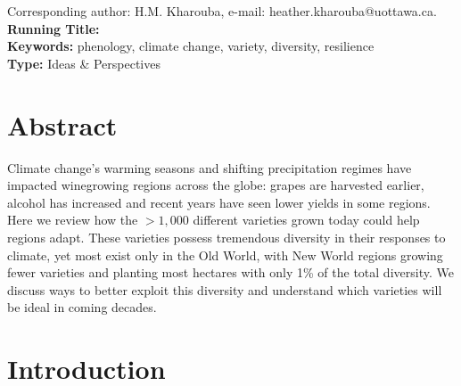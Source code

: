 \documentclass[11pt,letterpaper]{article}
\begin{document}
\linenumbers
\bigskip
\medskip
\begin{center}

\bigskip

\\
\bigskip
{}\\

\end{center}
\bigskip
\noindent Corresponding author: H.M. Kharouba, e-mail: heather.kharouba@uottawa.ca.\\

\noindent \textbf{Running Title:}\\
\noindent \textbf{Keywords:} phenology, climate change, variety, diversity, resilience\\ 
\noindent \textbf{Type:} Ideas \& Perspectives

\section{Abstract}
Climate change's warming seasons and shifting precipitation regimes have impacted winegrowing regions across the globe: grapes are harvested earlier, alcohol has increased and recent years have seen lower yields in some regions. Here we review how the $>1,000$ different varieties grown today could help regions adapt. These varieties possess tremendous diversity in their responses to climate, yet most exist only in the Old World, with New World regions growing fewer varieties and planting most hectares with only 1\% of the total diversity. We discuss ways to better exploit this diversity and understand which varieties will be ideal in coming decades. 




\section{Introduction}
\end{document}
